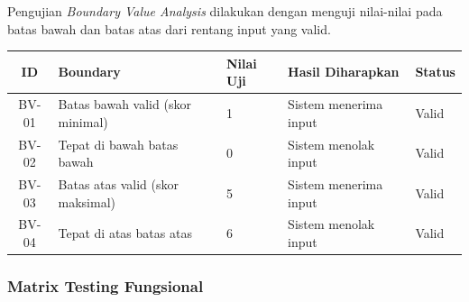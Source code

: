 \documentclass[12pt,a4paper,oneside]{report}
\begin{document}
Pengujian \textit{Boundary Value Analysis} dilakukan dengan menguji nilai-nilai pada batas bawah dan batas atas dari rentang input yang valid.

\begin{longtable}{|c|p{3cm}|p{2cm}|p{3cm}|p{2cm}|}
  \hline
  \textbf{ID} & \textbf{Boundary} & \textbf{Nilai Uji} & \textbf{Hasil Diharapkan} & \textbf{Status} \\
  \hline
  BV-01 & Batas bawah valid (skor minimal) & 1 & Sistem menerima input & Valid \\
  \hline
  BV-02 & Tepat di bawah batas bawah & 0 & Sistem menolak input & Valid \\
  \hline
  BV-03 & Batas atas valid (skor maksimal) & 5 & Sistem menerima input & Valid \\
  \hline
  BV-04 & Tepat di atas batas atas & 6 & Sistem menolak input & Valid \\
  \hline
\end{longtable}

\subsubsection{Matrix Testing Fungsional}
\end{document}
